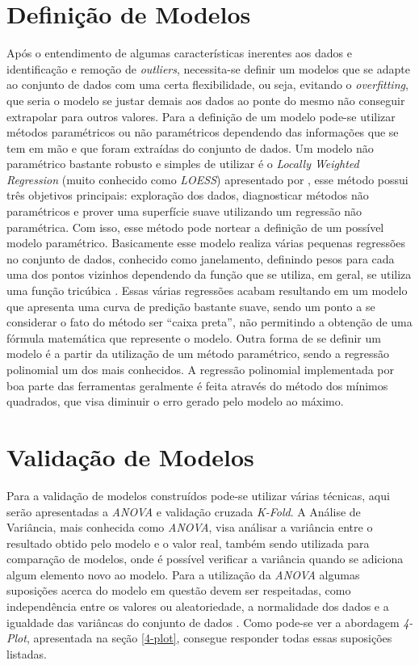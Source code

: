 \section{Definição de Modelos}\label{defmodels}

Após o entendimento de algumas características inerentes aos dados e
identificação e remoção de \textit{outliers}, necessita-se definir um modelos
que se adapte ao conjunto de dados com uma certa flexibilidade, ou seja,
evitando o \textit{overfitting}, que seria o modelo se justar demais aos dados
ao ponte do mesmo não conseguir extrapolar para outros valores. Para a definição
de um modelo pode-se utilizar métodos paramétricos ou não paramétricos
dependendo das informações que se tem em mão e que foram extraídas do conjunto
de dados. Um modelo não paramétrico bastante robusto e simples de utilizar é o
\textit{Locally Weighted Regression} (muito conhecido como \textit{LOESS})
apresentado por , esse método possui três objetivos
principais: exploração dos dados, diagnosticar métodos não paramétricos e prover
uma superfície suave utilizando um regressão não paramétrica. Com isso, esse
método pode nortear a definição de um possível modelo paramétrico. Basicamente
esse modelo realiza várias pequenas regressões no conjunto de dados, conhecido
como janelamento, definindo pesos para cada uma dos pontos vizinhos dependendo da
função que se utiliza, em geral, se utiliza uma função tricúbica
\cite{cleveland:1988}. Essas várias regressões acabam resultando em um modelo
que apresenta uma curva de predição bastante suave, sendo um ponto a se
considerar o fato do método ser ``caixa preta'', não permitindo a obtenção de
uma fórmula matemática que represente o modelo. Outra forma de se definir um
modelo é a partir da utilização de um método paramétrico, sendo a regressão
polinomial um dos mais conhecidos. A regressão polinomial implementada por boa
parte das ferramentas geralmente é feita através do método dos mínimos
quadrados, que visa diminuir o erro gerado pelo modelo ao máximo.

\section{Validação de Modelos}\label{valmodels}

Para a validação de modelos construídos pode-se utilizar várias técnicas, aqui
serão apresentadas a \textit{ANOVA} e validação cruzada \textit{K-Fold}. A
Análise de Variância, mais conhecida como \textit{ANOVA}, visa análisar a
variância entre o resultado obtido pelo modelo e o valor real, também sendo
utilizada para comparação de modelos, onde é possível verificar a variância
quando se adiciona algum elemento novo ao modelo. Para a utilização da
\textit{ANOVA} algumas suposições acerca do modelo em questão devem ser
respeitadas, como independência entre os valores ou aleatoriedade, a normalidade
dos dados e a igualdade das variâncas do conjunto de dados \cite{snedecor:1967}.
Como pode-se ver a abordagem \textit{4-Plot}, apresentada na seção \ref{4-plot},
consegue responder todas essas suposições listadas. 

